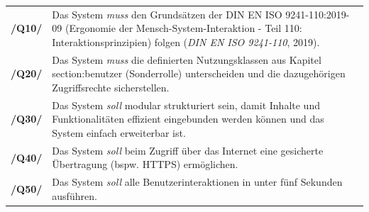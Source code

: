 \begin{center}
        \renewcommand{\arraystretch}{1.5}
        \begin{tabular}{p{}p{}}
                \hline
                \textbf{/Q10/} & Das System \textit{muss} den Grundsätzen der DIN EN ISO
                9241-110:2019-09 (Ergonomie der Mensch-System-Interaktion - Teil 110:
                Interaktionsprinzipien) folgen (\textit{DIN EN ISO 9241-110}, 2019).                                                                                                                \\
                \textbf{/Q20/} & Das System \textit{muss} die definierten Nutzungsklassen aus Kapitel
                section:benutzer (Sonderrolle) unterscheiden und die dazugehörigen Zugriffsrechte
                sicherstellen.                                                                                                                                                                      \\
                \textbf{/Q30/} & Das System \textit{soll} modular strukturiert sein, damit Inhalte und Funktionalitäten effizient eingebunden werden können und das System einfach erweiterbar ist. \\
                \textbf{/Q40/} & Das System \textit{soll} beim Zugriff über das Internet eine gesicherte Übertragung (bspw. \ac{HTTPS}) ermöglichen.                                                     \\
                \textbf{/Q50/} & Das System \textit{soll} alle Benutzerinteraktionen in unter fünf Sekunden ausführen.                                                                              \\
                \hline
        \end{tabular}
\end{center}
